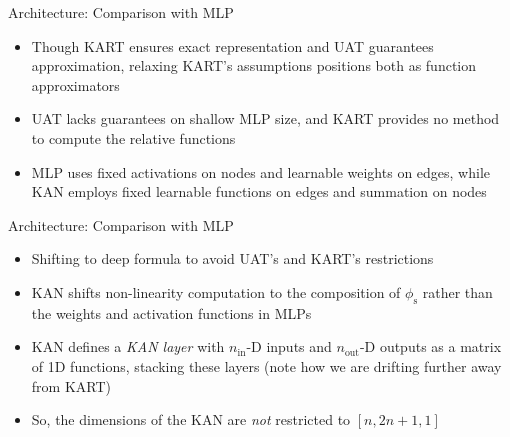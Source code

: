 \begin{frame}{Architecture: Comparison with MLP}
     \vspace{0.3em}
    \begin{itemize}
        \item Though KART ensures exact representation and UAT guarantees approximation, relaxing KART's assumptions positions both as function approximators \vspace{0.5em}
        \item UAT lacks guarantees on shallow MLP size, and KART provides no method to compute the relative functions \vspace{0.5em}
        \item MLP uses fixed activations on nodes and learnable weights on edges, while KAN employs fixed learnable functions on edges and summation on nodes \vspace{0.5em}
    \end{itemize}
\end{frame}

\begin{frame}{Architecture: Comparison with MLP}
     \vspace{0.3em}
    \begin{itemize}
        \item Shifting to deep formula to avoid UAT's and KART's restrictions \vspace{0.3em}
        \item KAN shifts non-linearity computation to the composition of $\phi_{\text{s}}$ rather than the
        weights and activation functions in MLPs \vspace{0.3em}
        \item KAN defines a \textit{KAN layer} with $n_{\text{in}}$-D inputs and $n_{\text{out}}$-D
        outputs as a matrix of 1D functions, stacking these layers (note how we are drifting further away from KART)\vspace{0.3em}
        \item So, the dimensions of the KAN are \textit{not} restricted to $[n, 2n+1, 1]$
    \end{itemize}
\end{frame}

